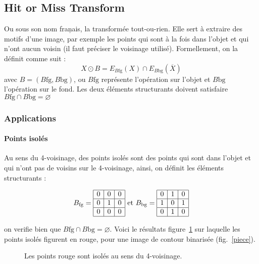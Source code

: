 \documentclass[10pt,a4paper]{article}
\begin{document}
\clearpage

\subsection{Hit or Miss Transform}

Ou sous son nom fran\c{}ais, la transform\'{e}e tout-ou-rien. Elle sert \`{a} extraire des motifs d'une image, par exemple les points qui sont \`{a} la fois dans l'objet et qui n'ont aucun voisin (il faut pr\'{e}ciser le voisinage utilis\'{e}). Formellement, on la d\'{e}finit comme suit : 
\begin{displaymath}
	X\odot B = E_{B{\text{fg}}}\left(X\right) \cap E_{B{\text{bg}}}\left(\overline{X}\right)
\end{displaymath}
avec $B = \left(B{\text{fg}},B{\text{bg}}\right)$, ou $B{\text{fg}}$ repr\'{e}sente l'op\'{e}ration sur l'objet et $B{\text{bg}}$ l'op\'{e}ration sur le fond. Les deux \'{e}l\'{e}ments structurants doivent satisfaire $B{\text{fg}}\cap B{\text{bg}} = \varnothing$

\subsubsection{Applications}

\paragraph{Points isol\'{e}s}
Au sens du 4-voisinage, des points isol\'{e}s sont des points qui sont dans l’objet et qui n'ont pas de voisins sur le 4-voisinage, ainsi, on d\'{e}finit les \'{e}l\'{e}ments structurants : 


\begin{displaymath}
B_{\text{fg}} = 
\begin{array}{|c|c|c|}
	\hline 0  & 0  & 0   \\
	\hline 0  & 1  & 0  \\
	\hline 0  & 0  & 0  \\
	\hline
\end{array}
\text{ et } 
B_{\text{bg}} = 
	\begin{array}{|c|c|c|}
	 \hline 0  & 1  & 0   \\
	 \hline 1  & 0  & 1  \\
	 \hline 0  & 1  & 0  \\
	\hline
	\end{array}
\end{displaymath}


on verifie bien que $B{\text{fg}}\cap B{\text{bg}} = \varnothing$. Voici le r\'{e}sultats figure~\ref{points} sur laquelle les points isol\'{e}s figurent en rouge, pour une image de contour binaris\'{e}e (fig.~\ref{piece}).
\begin{figure}[h]
\hspace{0.05\textwidth}\scalebox{0.66}{}
\vspace{-25mm}
	\caption{Les points rouge sont isol\'{e}s au sens du 4-voisinage.}
	\label{points}
\end{figure}
\clearpage
\end{document}
